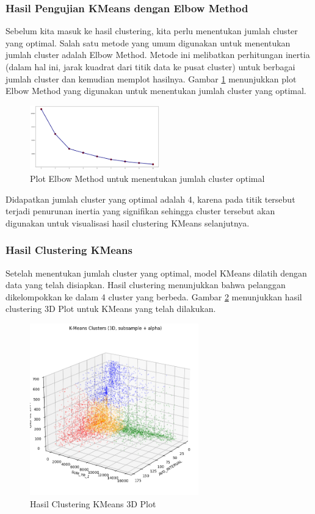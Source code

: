 \subsubsection{Hasil Pengujian KMeans dengan Elbow Method}
Sebelum kita masuk ke hasil clustering, kita perlu menentukan jumlah cluster yang optimal. Salah satu metode yang umum digunakan untuk menentukan jumlah cluster adalah Elbow Method. Metode ini melibatkan perhitungan inertia (dalam hal ini, jarak kuadrat dari titik data ke pusat cluster) untuk berbagai jumlah cluster dan kemudian memplot hasilnya. Gambar \ref{fig:elbow_method} menunjukkan plot Elbow Method yang digunakan untuk menentukan jumlah cluster yang optimal.

\begin{figure}[H]
    \centering
    \includegraphics[width=0.5\textwidth]{gambar/ElbowMethod.png}
    \caption{Plot Elbow Method untuk menentukan jumlah cluster optimal}
    \label{fig:elbow_method}
\end{figure}

Didapatkan jumlah cluster yang optimal adalah 4, karena pada titik tersebut terjadi penurunan inertia yang signifikan sehingga cluster tersebut akan digunakan untuk visualisasi hasil clustering KMeans selanjutnya.

\subsubsection{Hasil Clustering KMeans}
Setelah menentukan jumlah cluster yang optimal, model KMeans dilatih dengan data yang telah disiapkan. Hasil clustering menunjukkan bahwa pelanggan dikelompokkan ke dalam 4 cluster yang berbeda. Gambar \ref{fig:kmeans_clusters} menunjukkan hasil clustering 3D Plot untuk KMeans yang telah dilakukan.

\begin{figure}[H]
    \centering
    \includegraphics[width=0.65\textwidth]{gambar/hasilkmeans2.png}
    \caption{Hasil Clustering KMeans 3D Plot}
    \label{fig:kmeans_clusters}
\end{figure}

